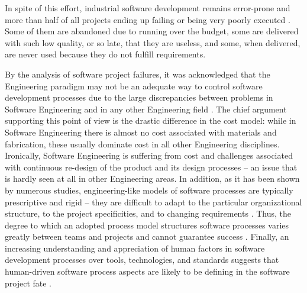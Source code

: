 In spite of this effort, industrial software development remains error-prone and more than half of all 
projects ending up failing or being very poorly executed \cite{chaos2006}.
Some of them are abandoned due to running over the budget, some are delivered with such low quality, 
or so late, that they are useless, and some, when delivered, are never used because they do not 
fulfill requirements. 

By the analysis of software project failures, it was acknowledged that the Engineering paradigm 
may not be an adequate way to control software development processes due to the large discrepancies 
between problems in Software Engineering and in any other Engineering field 
\cite{citeulike:3729379} \cite{citeulike:5203446} \cite{citeulike:2207657} \cite{citeulike:12550665}.
The chief argument supporting this point of view is the drastic difference in the cost model:
while in Software Engineering there is almost no cost associated with materials and fabrication, 
these usually dominate cost in all other Engineering disciplines. 
Ironically, Software Engineering is suffering from cost and challenges associated with 
continuous re-design of the product and its design processes -- an issue that is 
hardly seen at all in other Engineering areas. 
In addition, as it has been shown by numerous studies, engineering-like models of software processes 
are typically prescriptive and rigid -- they are difficult to adapt to the particular organizational 
structure, to the project specificities, and to changing requirements \cite{citeulike:113403}. 
Thus, the degree to which an adopted process model structures software processes varies greatly 
between teams and projects and cannot guarantee success \cite{sacchi_2001} \cite{citeulike:10567306}. 
Finally, an increasing understanding and appreciation of human factors in software development 
processes over tools, technologies, and standards suggests that human-driven software process aspects 
are likely to be defining in the software project fate \cite{citeulike:6580825} 
\cite{citeulike:149387} \cite{1605185} \cite{citeulike:113403} \cite{citeulike:12743107}. 

